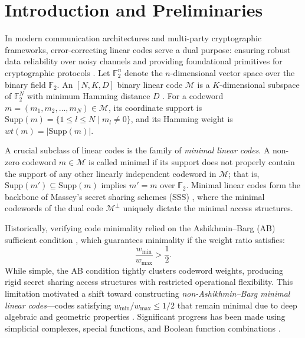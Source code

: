 \documentclass[pdflatex,sn-mathphys-num]{sn-jnl}%
\theoremstyle{thmstyleone}%
\theoremstyle{thmstyletwo}%
\theoremstyle{thmstylethree}%
\begin{document}

\maketitle

\section{Introduction and Preliminaries}

In modern communication architectures and multi-party cryptographic frameworks, error-correcting linear codes serve a dual purpose: ensuring robust data reliability over noisy channels and providing foundational primitives for cryptographic protocols \cite{LingXing2004}. Let $\mathbb{F}_{2}^n$ denote the $n$-dimensional vector space over the binary field $\mathbb{F}_{2}$. An $[N, K, D]$ binary linear code $\mathcal{M}$ is a $K$-dimensional subspace of $\mathbb{F}_{2}^N$ with minimum Hamming distance $D$ \cite{LingXing2004}. For a codeword $m = (m_1, m_2, \dots, m_N) \in \mathcal{M}$, its coordinate support is $\text{Supp}(m) = \{1 \le l \le N \mid m_l \neq 0\}$, and its Hamming weight is $wt(m) = |\text{Supp}(m)|$.

A crucial subclass of linear codes is the family of \emph{minimal linear codes}. A non-zero codeword $m \in \mathcal{M}$ is called minimal if its support does not properly contain the support of any other linearly independent codeword in $\mathcal{M}$; that is, $\text{Supp}(m') \subseteq \text{Supp}(m)$ implies $m' = m$ over $\mathbb{F}_2$. Minimal linear codes form the backbone of Massey's secret sharing schemes (SSS) \cite{Massey1993}, where the minimal codewords of the dual code $\mathcal{M}^\perp$ uniquely dictate the minimal access structures.

Historically, verifying code minimality relied on the Ashikhmin--Barg (AB) sufficient condition \cite{AshikhminBarg1998}, which guarantees minimality if the weight ratio satisfies:
\begin{equation}\label{eq:ash_barg}
\frac{w_{\min}}{w_{\max}} > \frac{1}{2}.
\end{equation}
While simple, the AB condition tightly clusters codeword weights, producing rigid secret sharing access structures with restricted operational flexibility. This limitation motivated a shift toward constructing \emph{non-Ashikhmin--Barg minimal linear codes}—codes satisfying $w_{\min}/w_{\max} \le 1/2$ that remain minimal due to deep algebraic and geometric properties \cite{DingHengZhou2018, HengDingZhou2018, LuWuCao2021}. Significant progress has been made using simplicial complexes, special functions, and Boolean function combinations \cite{CarletDingYuan2005, Ding2016, LiYue2020, MesnagerQianCaoYuan2023, YuanDing2005}.
\end{document}
